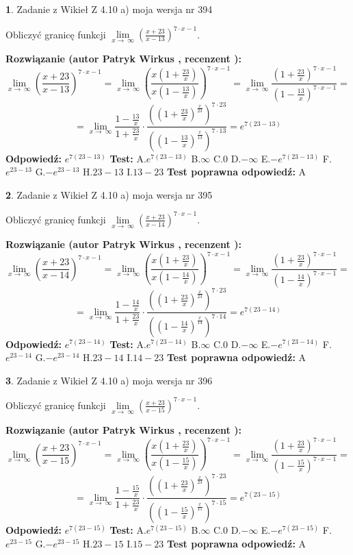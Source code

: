 \documentclass[12pt, a4paper]{article}
\theoremstyle{definition} %
\newtheorem{zad}{}
\newcommand{\zadStart}[1]{\begin{zad}#1\newline}
\newcommand{\zadStop}{\end{zad}}
\newcommand{\rozwStart}[2]{\noindent \textbf{Rozwiązanie (autor #1 , recenzent #2): }\newline}
\newcommand{\rozwStop}{\newline}
\newcommand{\odpStart}{\noindent \textbf{Odpowiedź:}\newline}
\newcommand{\odpStop}{\newline}
\newcommand{\testStart}{\noindent \textbf{Test:}\newline}
\newcommand{\testStop}{\newline}
\newcommand{\kluczStart}{\noindent \textbf{Test poprawna odpowiedź:}\newline}
\newcommand{\kluczStop}{\newline}
\begin{document}
\zadStart{Zadanie z Wikieł Z 4.10 a) moja wersja nr 394}


Obliczyć granicę funkcji  $\lim\limits_{x\to\ \infty}(\frac{x+23}{x-13})^{7\cdot x-1}$.
\zadStop
\rozwStart{Patryk Wirkus}{}
$$\lim\limits_{x\to\ \infty}(\frac{x+23}{x-13})^{7\cdot x-1} = \lim\limits_{x\to\ \infty}(\frac{x(1+\frac{23}{x})}{x(1-\frac{13}{x})})^{7\cdot x-1}=\lim\limits_{x\to\ \infty}\frac{(1+\frac{23}{x})^{7\cdot x-1}}{(1-\frac{13}{x})^{7\cdot x-1}}=$$
$$=\lim\limits_{x\to\ \infty}\frac{1-\frac{13}{x}}{1+\frac{23}{x}}\cdot\frac{((1+\frac{23}{x})^{\frac{x}{23}})^{7\cdot23}}{((1-\frac{13}{x})^{\frac{x}{13}})^{7\cdot13}}=e^{7(23-13)}$$
\rozwStop
\odpStart
$e^{7(23-13)}$
\odpStop
\testStart
A.$e^{7(23-13)}$ B.$\infty$ C.$0$ D.$-\infty$ E.$-e^{7(23-13)}$
F.$e^{23-13}$ G.$-e^{23-13}$
H.$23-13$
I.$13-23$
\testStop
\kluczStart
A
\kluczStop



\zadStart{Zadanie z Wikieł Z 4.10 a) moja wersja nr 395}


Obliczyć granicę funkcji  $\lim\limits_{x\to\ \infty}(\frac{x+23}{x-14})^{7\cdot x-1}$.
\zadStop
\rozwStart{Patryk Wirkus}{}
$$\lim\limits_{x\to\ \infty}(\frac{x+23}{x-14})^{7\cdot x-1} = \lim\limits_{x\to\ \infty}(\frac{x(1+\frac{23}{x})}{x(1-\frac{14}{x})})^{7\cdot x-1}=\lim\limits_{x\to\ \infty}\frac{(1+\frac{23}{x})^{7\cdot x-1}}{(1-\frac{14}{x})^{7\cdot x-1}}=$$
$$=\lim\limits_{x\to\ \infty}\frac{1-\frac{14}{x}}{1+\frac{23}{x}}\cdot\frac{((1+\frac{23}{x})^{\frac{x}{23}})^{7\cdot23}}{((1-\frac{14}{x})^{\frac{x}{14}})^{7\cdot14}}=e^{7(23-14)}$$
\rozwStop
\odpStart
$e^{7(23-14)}$
\odpStop
\testStart
A.$e^{7(23-14)}$ B.$\infty$ C.$0$ D.$-\infty$ E.$-e^{7(23-14)}$
F.$e^{23-14}$ G.$-e^{23-14}$
H.$23-14$
I.$14-23$
\testStop
\kluczStart
A
\kluczStop



\zadStart{Zadanie z Wikieł Z 4.10 a) moja wersja nr 396}


Obliczyć granicę funkcji  $\lim\limits_{x\to\ \infty}(\frac{x+23}{x-15})^{7\cdot x-1}$.
\zadStop
\rozwStart{Patryk Wirkus}{}
$$\lim\limits_{x\to\ \infty}(\frac{x+23}{x-15})^{7\cdot x-1} = \lim\limits_{x\to\ \infty}(\frac{x(1+\frac{23}{x})}{x(1-\frac{15}{x})})^{7\cdot x-1}=\lim\limits_{x\to\ \infty}\frac{(1+\frac{23}{x})^{7\cdot x-1}}{(1-\frac{15}{x})^{7\cdot x-1}}=$$
$$=\lim\limits_{x\to\ \infty}\frac{1-\frac{15}{x}}{1+\frac{23}{x}}\cdot\frac{((1+\frac{23}{x})^{\frac{x}{23}})^{7\cdot23}}{((1-\frac{15}{x})^{\frac{x}{15}})^{7\cdot15}}=e^{7(23-15)}$$
\rozwStop
\odpStart
$e^{7(23-15)}$
\odpStop
\testStart
A.$e^{7(23-15)}$ B.$\infty$ C.$0$ D.$-\infty$ E.$-e^{7(23-15)}$
F.$e^{23-15}$ G.$-e^{23-15}$
H.$23-15$
I.$15-23$
\testStop
\kluczStart
A
\kluczStop
\end{document}
